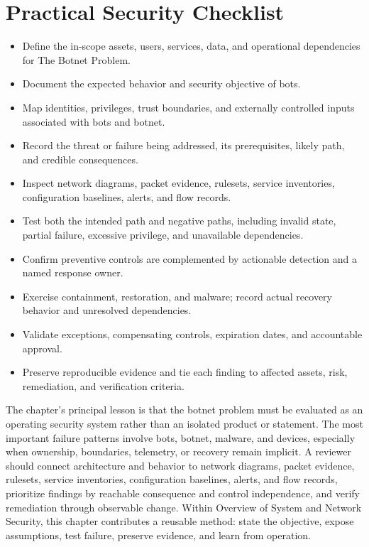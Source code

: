 \documentclass[11pt]{article}
\begin{document}
\section*{Practical Security Checklist}
\begin{itemize}[label=$\square$]
\item Define the in-scope assets, users, services, data, and operational dependencies for The Botnet Problem.
\item Document the expected behavior and security objective of bots.
\item Map identities, privileges, trust boundaries, and externally controlled inputs associated with bots and botnet.
\item Record the threat or failure being addressed, its prerequisites, likely path, and credible consequences.
\item Inspect network diagrams, packet evidence, rulesets, service inventories, configuration baselines, alerts, and flow records.
\item Test both the intended path and negative paths, including invalid state, partial failure, excessive privilege, and unavailable dependencies.
\item Confirm preventive controls are complemented by actionable detection and a named response owner.
\item Exercise containment, restoration, and malware; record actual recovery behavior and unresolved dependencies.
\item Validate exceptions, compensating controls, expiration dates, and accountable approval.
\item Preserve reproducible evidence and tie each finding to affected assets, risk, remediation, and verification criteria.
\end{itemize}
\begin{synthesisbox}
The chapter's principal lesson is that the botnet problem must be evaluated as an operating security system rather than an isolated product or statement. The most important failure patterns involve bots, botnet, malware, and devices, especially when ownership, boundaries, telemetry, or recovery remain implicit. A reviewer should connect architecture and behavior to network diagrams, packet evidence, rulesets, service inventories, configuration baselines, alerts, and flow records, prioritize findings by reachable consequence and control independence, and verify remediation through observable change. Within Overview of System and Network Security, this chapter contributes a reusable method: state the objective, expose assumptions, test failure, preserve evidence, and learn from operation.
\end{synthesisbox}
\end{document}
